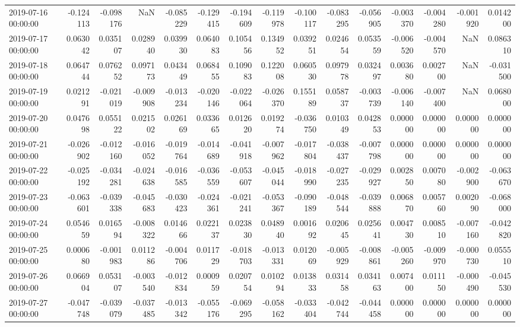 \begin{tabular}{lrrrrrrrrrrrrrr}
2019-07-16 00:00:00 & -0.124113 & -0.098176 & NaN & -0.085229 & -0.129415 & -0.194609 & -0.119978 & -0.100117 & -0.083295 & -0.056905 & -0.003370 & -0.004280 & -0.001920 & 0.014200 \\
2019-07-17 00:00:00 & 0.063042 & 0.035107 & 0.028940 & 0.039930 & 0.064083 & 0.105456 & 0.134952 & 0.039251 & 0.024654 & 0.053559 & -0.006520 & -0.004570 & NaN & 0.086310 \\
2019-07-18 00:00:00 & 0.064744 & 0.076252 & 0.097173 & 0.043449 & 0.068455 & 0.109083 & 0.122008 & 0.060530 & 0.097978 & 0.032497 & 0.003680 & 0.002700 & NaN & -0.031500 \\
2019-07-19 00:00:00 & 0.021291 & -0.021019 & -0.009908 & -0.013234 & -0.020146 & -0.022064 & -0.026370 & 0.155189 & 0.058737 & -0.003739 & -0.006140 & -0.007400 & NaN & 0.068000 \\
2019-07-20 00:00:00 & 0.047698 & 0.055122 & 0.021502 & 0.026169 & 0.033665 & 0.012620 & 0.019274 & -0.036750 & 0.010349 & 0.042853 & 0.000000 & 0.000000 & 0.000000 & 0.000000 \\
2019-07-21 00:00:00 & -0.026902 & -0.012160 & -0.016052 & -0.019764 & -0.014689 & -0.041918 & -0.007962 & -0.017804 & -0.038437 & -0.007798 & 0.000000 & 0.000000 & 0.000000 & 0.000000 \\
2019-07-22 00:00:00 & -0.025192 & -0.034281 & -0.024638 & -0.016585 & -0.036559 & -0.053607 & -0.045044 & -0.018990 & -0.027235 & -0.029927 & 0.002850 & 0.007080 & -0.002900 & -0.063670 \\
2019-07-23 00:00:00 & -0.063601 & -0.039338 & -0.045683 & -0.030423 & -0.024361 & -0.021241 & -0.053367 & -0.090189 & -0.048544 & -0.039888 & 0.006870 & 0.005760 & 0.002090 & -0.068000 \\
2019-07-24 00:00:00 & 0.054659 & 0.016594 & -0.008322 & 0.014666 & 0.022137 & 0.023830 & 0.048940 & 0.001692 & 0.020645 & 0.025641 & 0.004730 & 0.008510 & -0.007160 & -0.042820 \\
2019-07-25 00:00:00 & 0.000680 & -0.001983 & 0.011286 & -0.004706 & 0.011729 & -0.018703 & -0.013331 & 0.012069 & -0.005929 & -0.008861 & -0.005260 & -0.009970 & -0.000730 & 0.055510 \\
2019-07-26 00:00:00 & 0.066904 & 0.053107 & -0.003540 & -0.012834 & 0.000959 & 0.020754 & 0.010294 & 0.013833 & 0.031458 & 0.034163 & 0.007400 & 0.011150 & -0.000490 & -0.045530 \\
2019-07-27 00:00:00 & -0.047748 & -0.039079 & -0.037485 & -0.013342 & -0.055176 & -0.069295 & -0.058162 & -0.033404 & -0.042744 & -0.044458 & 0.000000 & 0.000000 & 0.000000 & 0.000000 \\

\end{tabular}
